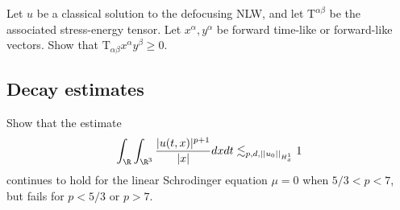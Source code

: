 \begin{statement}
	Let $u$ be a classical solution to the defocusing NLW, and let $\text{T}^{\alpha \beta}$ be the associated stress-energy tensor. Let $x^\alpha, y^\alpha$ be forward time-like or forward-like vectors. Show that $\text{T}_{\alpha\beta} x^\alpha y^\beta \geq 0$. 
\end{statement}

\begin{solution}

\end{solution}

\subsection{Decay estimates}

\begin{statement}
	Show that the estimate
		\[ \int_\R \int_{\R^3} \frac{|u(t, x)|^{p + 1}}{|x|} dx dt \lesssim_{p, d, ||u_0||_{H^1_x}} 1 \]
	continues to hold for the linear Schrodinger equation $\mu = 0$ when $5/3 < p < 7$, but fails for $p < 5/3$ or $p > 7$. 
\end{statement}


